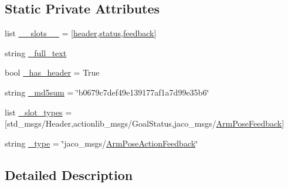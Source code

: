 \subsection*{Static Private Attributes}
\begin{DoxyCompactItemize}
\item 
list \hyperlink{classjaco__msgs_1_1msg_1_1__ArmPoseActionFeedback_1_1ArmPoseActionFeedback_a9c1fb61fb4ec0a2753b0bc4ec1800de5}{\+\_\+\+\_\+slots\+\_\+\+\_\+} = \mbox{[}\textquotesingle{}\hyperlink{classjaco__msgs_1_1msg_1_1__ArmPoseActionFeedback_1_1ArmPoseActionFeedback_a29a02efc077766aa6b97432487639dfe}{header}\textquotesingle{},\textquotesingle{}\hyperlink{classjaco__msgs_1_1msg_1_1__ArmPoseActionFeedback_1_1ArmPoseActionFeedback_a401e259f50e0f76aa3b79d712f3ef72c}{status}\textquotesingle{},\textquotesingle{}\hyperlink{classjaco__msgs_1_1msg_1_1__ArmPoseActionFeedback_1_1ArmPoseActionFeedback_a3c9079d060107fb271e00b9cc073b42c}{feedback}\textquotesingle{}\mbox{]}
\item 
string \hyperlink{classjaco__msgs_1_1msg_1_1__ArmPoseActionFeedback_1_1ArmPoseActionFeedback_a7f2d014c6936d9306cf194ca8c2ea5f9}{\+\_\+full\+\_\+text}
\item 
bool \hyperlink{classjaco__msgs_1_1msg_1_1__ArmPoseActionFeedback_1_1ArmPoseActionFeedback_ade7415207299c3c525855c9b4ff0143e}{\+\_\+has\+\_\+header} = True
\item 
string \hyperlink{classjaco__msgs_1_1msg_1_1__ArmPoseActionFeedback_1_1ArmPoseActionFeedback_a1e7ab27dbeaeffc884dc439e74721690}{\+\_\+md5sum} = \char`\"{}b0679c7def49e139177af1a7d99e35b6\char`\"{}
\item 
list \hyperlink{classjaco__msgs_1_1msg_1_1__ArmPoseActionFeedback_1_1ArmPoseActionFeedback_aa77c52e5e04a0af7d40d2c6e2fdf2493}{\+\_\+slot\+\_\+types} = \mbox{[}\textquotesingle{}std\+\_\+msgs/Header\textquotesingle{},\textquotesingle{}actionlib\+\_\+msgs/Goal\+Status\textquotesingle{},\textquotesingle{}jaco\+\_\+msgs/\hyperlink{classjaco__msgs_1_1msg_1_1__ArmPoseFeedback_1_1ArmPoseFeedback}{Arm\+Pose\+Feedback}\textquotesingle{}\mbox{]}
\item 
string \hyperlink{classjaco__msgs_1_1msg_1_1__ArmPoseActionFeedback_1_1ArmPoseActionFeedback_a396826cb9907ef9f3b8a37233a705f67}{\+\_\+type} = \char`\"{}jaco\+\_\+msgs/\hyperlink{classjaco__msgs_1_1msg_1_1__ArmPoseActionFeedback_1_1ArmPoseActionFeedback}{Arm\+Pose\+Action\+Feedback}\char`\"{}
\end{DoxyCompactItemize}


\subsection{Detailed Description}


